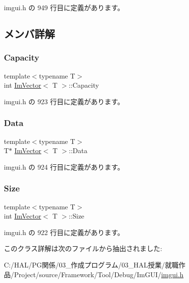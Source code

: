  imgui.\+h の 949 行目に定義があります。



\subsection{メンバ詳解}
\mbox{\label{class_im_vector_abd24482b4d30d22e37582e521e5bfb33}} 
\subsubsection{\texorpdfstring{Capacity}{Capacity}}
{\footnotesize\ttfamily template$<$typename T$>$ \\
int \mbox{\hyperlink{class_im_vector}{Im\+Vector}}$<$ T $>$\+::Capacity}



 imgui.\+h の 923 行目に定義があります。

\mbox{\label{class_im_vector_ac0e46e8b30cb079d93c8f0aad7d7cbd0}} 
\subsubsection{\texorpdfstring{Data}{Data}}
{\footnotesize\ttfamily template$<$typename T$>$ \\
T$\ast$ \mbox{\hyperlink{class_im_vector}{Im\+Vector}}$<$ T $>$\+::Data}



 imgui.\+h の 924 行目に定義があります。

\mbox{\label{class_im_vector_abbfd157947f66280d27b21d70a16df8d}} 
\subsubsection{\texorpdfstring{Size}{Size}}
{\footnotesize\ttfamily template$<$typename T$>$ \\
int \mbox{\hyperlink{class_im_vector}{Im\+Vector}}$<$ T $>$\+::Size}



 imgui.\+h の 922 行目に定義があります。



このクラス詳解は次のファイルから抽出されました\+:\begin{DoxyCompactItemize}
\item 
C\+:/\+H\+A\+L/\+P\+G関係/03\+\_\+作成プログラム/03\+\_\+\+H\+A\+L授業/就職作品/\+Project/source/\+Framework/\+Tool/\+Debug/\+Im\+G\+U\+I/\mbox{\hyperlink{imgui_8h}{imgui.\+h}}\end{DoxyCompactItemize}
